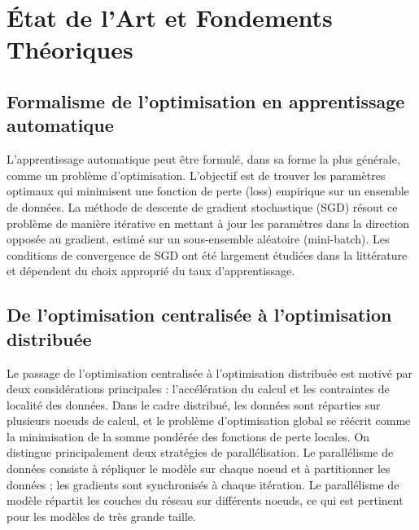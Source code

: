 \documentclass[12pt,a4paper]{report}
\begin{document}
\chapter{\'{E}tat de l'Art et Fondements Th\'{e}oriques}

\section{Formalisme de l'optimisation en apprentissage automatique}

L'apprentissage automatique peut \^{e}tre formul\'{e}, dans sa forme la plus g\'{e}n\'{e}rale, comme un probl\`{e}me d'optimisation. L'objectif est de trouver les param\`{e}tres optimaux qui minimisent une fonction de perte (loss) empirique sur un ensemble de donn\'{e}es. La m\'{e}thode de descente de gradient stochastique (SGD) r\'{e}sout ce probl\`{e}me de mani\`{e}re it\'{e}rative en mettant \`{a} jour les param\`{e}tres dans la direction oppos\'{e}e au gradient, estim\'{e} sur un sous-ensemble al\'{e}atoire (mini-batch). Les conditions de convergence de SGD ont \'{e}t\'{e} largement \'{e}tudi\'{e}es dans la litt\'{e}rature et d\'{e}pendent du choix appropri\'{e} du taux d'apprentissage.

\section{De l'optimisation centralis\'{e}e \`{a} l'optimisation distribu\'{e}e}

Le passage de l'optimisation centralis\'{e}e \`{a} l'optimisation distribu\'{e}e est motiv\'{e} par deux consid\'{e}rations principales : l'acc\'{e}l\'{e}ration du calcul et les contraintes de localit\'{e} des donn\'{e}es. Dans le cadre distribu\'{e}, les donn\'{e}es sont r\'{e}parties sur plusieurs noeuds de calcul, et le probl\`{e}me d'optimisation global se r\'{e}\'{e}crit comme la minimisation de la somme pond\'{e}r\'{e}e des fonctions de perte locales. On distingue principalement deux strat\'{e}gies de parall\'{e}lisation. Le parall\'{e}lisme de donn\'{e}es consiste \`{a} r\'{e}pliquer le mod\`{e}le sur chaque noeud et \`{a} partitionner les donn\'{e}es ; les gradients sont synchronis\'{e}s \`{a} chaque it\'{e}ration. Le parall\'{e}lisme de mod\`{e}le r\'{e}partit les couches du r\'{e}seau sur diff\'{e}rents noeuds, ce qui est pertinent pour les mod\`{e}les de tr\`{e}s grande taille.
\end{document}
